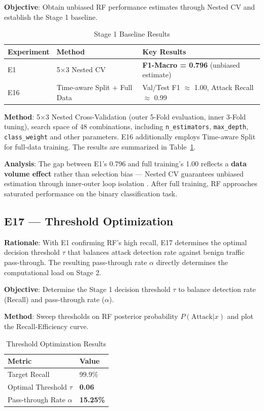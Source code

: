 \documentclass[sigconf]{acmart}
\begin{document}
\textbf{Objective}: Obtain unbiased RF performance estimates through Nested CV and establish the Stage 1 baseline.


\begin{table}[!t]
\caption{Stage 1 Baseline Results}
\label{tab:s1_baseline}
\begin{tabular}{p{1.5cm}p{5.5cm}p{9.5cm}}
\toprule
\textbf{Experiment} & \textbf{Method} & \textbf{Key Results} \\
\midrule
E1 & 5$\times$3 Nested CV & \textbf{F1-Macro = 0.796} (unbiased estimate) \\
E16 & Time-aware Split + Full Data & Val/Test F1 $\approx$ 1.00, Attack Recall $\approx$ 0.99 \\
\bottomrule
\end{tabular}
\end{table}

\textbf{Method}: 5$\times$3 Nested Cross-Validation (outer 5-Fold evaluation, inner 3-Fold tuning), search space of 48 combinations, including \texttt{n\_estimators}, \texttt{max\_depth}, \texttt{class\_weight} and other parameters. E16 additionally employs Time-aware Split for full-data training. The results are summarized in Table~\ref{tab:s1_baseline}.

\textbf{Analysis}: The gap between E1's 0.796 and full training's 1.00 reflects a \textbf{data volume effect} rather than selection bias --- Nested CV guarantees unbiased estimation through inner-outer loop isolation \cite{12}. After full training, RF approaches saturated performance on the binary classification task.

\subsection{E17 --- Threshold Optimization}
\textbf{Rationale}: With E1 confirming RF's high recall, E17 determines the optimal decision threshold $\tau$ that balances attack detection rate against benign traffic pass-through. The resulting pass-through rate $\alpha$ directly determines the computational load on Stage 2.

\textbf{Objective}: Determine the Stage 1 decision threshold $\tau$ to balance detection rate (Recall) and pass-through rate ($\alpha$).

\textbf{Method}: Sweep thresholds on RF posterior probability $P(\text{Attack}|x)$ and plot the Recall-Efficiency curve.

\begin{table}[!h]
\caption{Threshold Optimization Results}
\label{tab:threshold_results}
\begin{tabular}{ll}
\toprule
\textbf{Metric} & \textbf{Value} \\
\midrule
Target Recall & 99.9\% \\
Optimal Threshold $\tau$ & \textbf{0.06} \\
Pass-through Rate $\alpha$ & \textbf{15.25\%} \\
\bottomrule
\end{tabular}
\end{table}
\end{document}
